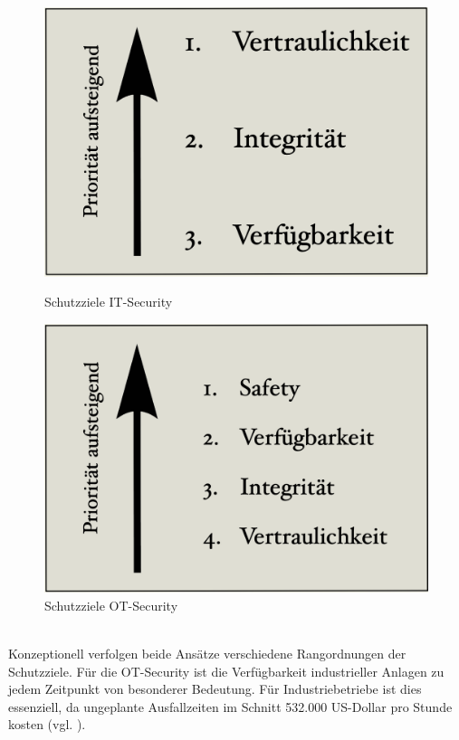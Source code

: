 \begin{figure}[h]
    \centering
    \begin{minipage}{0.45\textwidth}
        \centering
        \includegraphics[scale=.3]{images/ITS.png}
        \caption{Schutzziele IT-Security}
        \label{fig:meine-grafik1}
    \end{minipage}
    \hfill
    \begin{minipage}{0.45\textwidth}
        \centering
        \includegraphics[scale=.299]{images/OTS.png}
        \caption{Schutzziele OT-Security}
        \label{fig:meine-grafik2}
    \end{minipage}
\end{figure}
\\ Konzeptionell verfolgen beide Ansätze verschiedene Rangordnungen der Schutzziele. Für die OT-Security ist die Verfügbarkeit industrieller Anlagen zu jedem Zeitpunkt von besonderer Bedeutung. Für Industriebetriebe ist dies essenziell, da ungeplante Ausfallzeiten im Schnitt 532.000 US-Dollar pro Stunde kosten (vgl. \cite{OTS/ITS}). 
